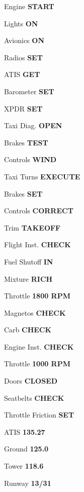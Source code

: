 \documentclass[8pt]{article}
\begin{document}
\begin{multicols*}{3}
Engine \dotfill \textbf{START}

Lights \dotfill \textbf{ON}

Avionics \dotfill \textbf{ON}

Radios \dotfill \textbf{SET}

ATIS \dotfill \textbf{GET}

Barometer \dotfill \textbf{SET}

XPDR \dotfill \textbf{SET}

Taxi Diag. \dotfill \textbf{OPEN}

\colorbox{green!80!red}{}

Brakes \dotfill \textbf{TEST}

Controls \dotfill \textbf{WIND}

Taxi Turns \dotfill \textbf{EXECUTE}

\colorbox{green!80!red}{}

Brakes \dotfill \textbf{SET}

Controls \dotfill \textbf{CORRECT}

Trim \dotfill \textbf{TAKEOFF}

Flight Inst. \dotfill \textbf{CHECK}

Fuel Shutoff \dotfill \textbf{IN}

Mixture \dotfill \textbf{RICH}

Throttle \dotfill \textbf{1800 RPM}

Magnetos \dotfill \textbf{CHECK}

Carb \dotfill \textbf{CHECK}

Engine Inst. \dotfill \textbf{CHECK}

Throttle \dotfill \textbf{1000 RPM}

Doors \dotfill \textbf{CLOSED}

Seatbelts \dotfill \textbf{CHECK}

Throttle Friction \dotfill \textbf{SET} \\

\colorbox{orange!80}{}

\colorbox{orange!60}{}

ATIS \dotfill \textbf{135.27}

Ground \dotfill \textbf{125.0}

Tower \dotfill \textbf{118.6}

Runway \dotfill \textbf{13/31}


\end{multicols*}
\end{document}
